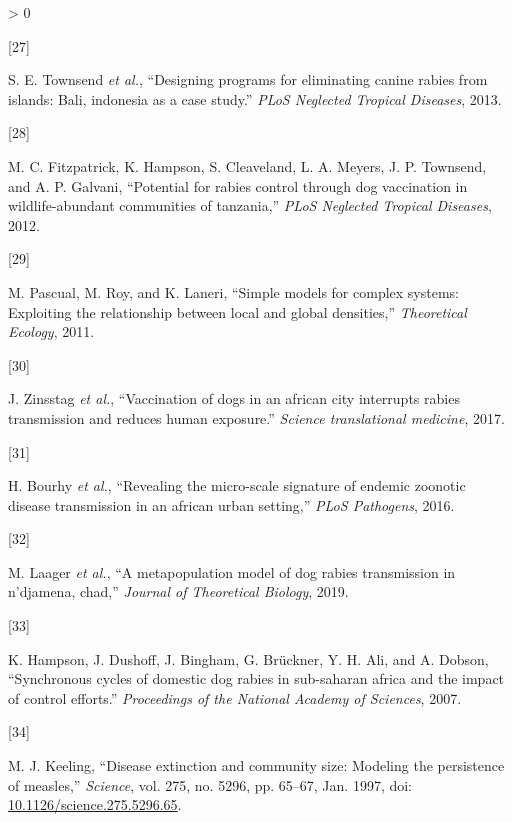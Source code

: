 \documentclass[
  oneside]{book}
\newlength{\cslhangindent}
\newlength{\csllabelwidth}
\newenvironment{CSLReferences}[2] %
 {%
  \setlength{\parindent}{0pt}
  \ifodd #1 \everypar{\setlength{\hangindent}{\cslhangindent}}\ignorespaces\fi
  \ifnum #2 > 0
  \setlength{\parskip}{#2\baselineskip}
  \fi
 }%
 {}
\newcommand{\CSLLeftMargin}[1]{\parbox[t]{\csllabelwidth}{#1}}
\newcommand{\CSLRightInline}[1]{\parbox[t]{\linewidth - \csllabelwidth}{#1}\break}
\begin{document}
\begin{CSLReferences}{0}{0}
\leavevmode\hypertarget{ref-townsend2013}{}%
\CSLLeftMargin{{[}27{]} }
\CSLRightInline{S. E. Townsend \emph{et al.}, {``Designing programs for eliminating canine rabies from islands: Bali, indonesia as a case study.''} \emph{PLoS Neglected Tropical Diseases}, 2013.}

\leavevmode\hypertarget{ref-fitzpatrick2012}{}%
\CSLLeftMargin{{[}28{]} }
\CSLRightInline{M. C. Fitzpatrick, K. Hampson, S. Cleaveland, L. A. Meyers, J. P. Townsend, and A. P. Galvani, {``Potential for rabies control through dog vaccination in wildlife-abundant communities of tanzania,''} \emph{PLoS Neglected Tropical Diseases}, 2012.}

\leavevmode\hypertarget{ref-pascual2011}{}%
\CSLLeftMargin{{[}29{]} }
\CSLRightInline{M. Pascual, M. Roy, and K. Laneri, {``Simple models for complex systems: Exploiting the relationship between local and global densities,''} \emph{Theoretical Ecology}, 2011.}

\leavevmode\hypertarget{ref-zinsstag2017}{}%
\CSLLeftMargin{{[}30{]} }
\CSLRightInline{J. Zinsstag \emph{et al.}, {``Vaccination of dogs in an african city interrupts rabies transmission and reduces human exposure.''} \emph{Science translational medicine}, 2017.}

\leavevmode\hypertarget{ref-bourhy2016}{}%
\CSLLeftMargin{{[}31{]} }
\CSLRightInline{H. Bourhy \emph{et al.}, {``Revealing the micro-scale signature of endemic zoonotic disease transmission in an african urban setting,''} \emph{PLoS Pathogens}, 2016.}

\leavevmode\hypertarget{ref-laager2019}{}%
\CSLLeftMargin{{[}32{]} }
\CSLRightInline{M. Laager \emph{et al.}, {``A metapopulation model of dog rabies transmission in n'djamena, chad,''} \emph{Journal of Theoretical Biology}, 2019.}

\leavevmode\hypertarget{ref-hampson2007}{}%
\CSLLeftMargin{{[}33{]} }
\CSLRightInline{K. Hampson, J. Dushoff, J. Bingham, G. Brückner, Y. H. Ali, and A. Dobson, {``Synchronous cycles of domestic dog rabies in sub-saharan africa and the impact of control efforts.''} \emph{Proceedings of the National Academy of Sciences}, 2007.}

\leavevmode\hypertarget{ref-keeling1997}{}%
\CSLLeftMargin{{[}34{]} }
\CSLRightInline{M. J. Keeling, {``Disease extinction and community size: Modeling the persistence of measles,''} \emph{Science}, vol. 275, no. 5296, pp. 65--67, Jan. 1997, doi: \href{https://doi.org/10.1126/science.275.5296.65}{10.1126/science.275.5296.65}.}


\end{CSLReferences}
\end{document}
